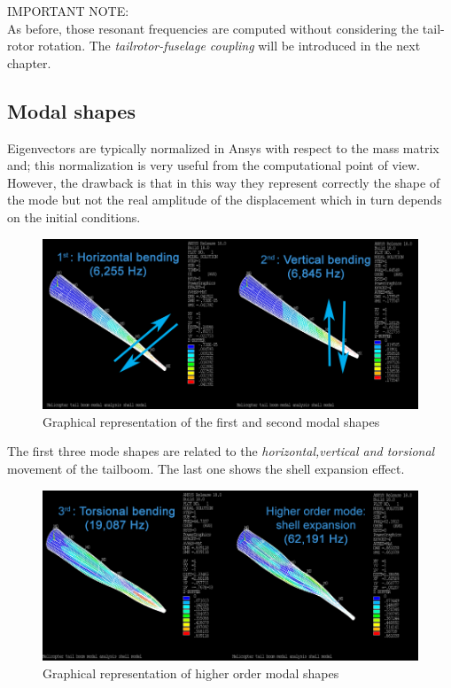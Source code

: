 \bigskip
\noindent
IMPORTANT NOTE: \\
\noindent
As before, those resonant frequencies are computed without considering the tail-rotor rotation.
The \emph{tailrotor-fuselage coupling} will be introduced in the next chapter.

\clearpage

\subsection*{Modal shapes}
\noindent
Eigenvectors are typically normalized in Ansys with respect to the mass matrix and; this normalization is very useful from the computational point of view. However, the drawback is that in this way they represent correctly the shape of the mode but not the real amplitude of the displacement which in turn depends on the initial conditions. 

\begin{figure}[h]
	\begin{center}
		\centering  		 		
		\includegraphics[width=0.95\linewidth]{PICTURES/3_Ecureuil/1-2.png}
	\end{center}
	\caption {Graphical representation of the first and second modal shapes}
\end{figure}

\noindent
The first three mode shapes are related to the \emph{horizontal,vertical and torsional} movement of the tailboom. The last one shows the shell expansion effect. 

\begin{figure}[h]
	\begin{center}
		\centering  		 		
		\includegraphics[width=0.95\linewidth]{PICTURES/3_Ecureuil/3-4.png}
	\end{center}
	\caption {Graphical representation of higher order modal shapes}
\end{figure}
